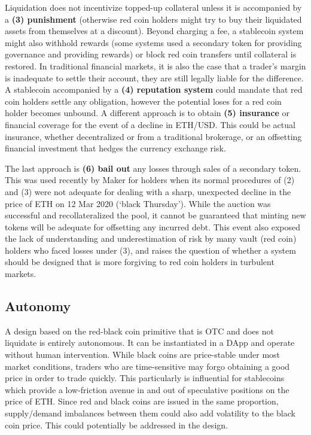 Liquidation does not incentivize topped-up collateral unless it is accompanied by a \textbf{(3) punishment} (otherwise red coin holders might try to buy their liquidated assets from themselves at a discount). Beyond charging a fee, a stablecoin system might also withhold rewards (some systems used a secondary token for providing governance and providing rewards) or block red coin transfers until collateral is restored. In traditional financial markets, it is also the case that a trader's margin is inadequate to settle their account, they are still legally liable for the difference. A stablecoin accompanied by a \textbf{(4) reputation system} could mandate that red coin holders settle any obligation, however the potential loses for a red coin holder becomes unbound. A different approach is to obtain \textbf{(5) insurance} or financial coverage for the event of a decline in ETH/USD. This could be actual insurance, whether decentralized or from a traditional brokerage, or an offsetting financial investment that hedges the currency exchange risk. %

The last approach is \textbf{(6) bail out} any losses through sales of a secondary token. This was used recently by Maker for \dai holders when its normal procedures of (2) and (3) were not adequate for dealing with a sharp, unexpected decline in the price of ETH on 12 Mar 2020 (`black Thursday'). While the auction was successful and recollateralized the pool, it cannot be guaranteed that minting new tokens will be adequate for offsetting any incurred debt. This event also exposed the lack of understanding and underestimation of risk by many vault (\ie red coin) holders who faced losses under (3), and raises the question of whether a system should be designed that is more forgiving to red coin holders in turbulent markets.%


\subsection{Autonomy} 

A design based on the red-black coin primitive that is OTC and does not liquidate is entirely autonomous. It can be instantiated in a DApp and operate without human intervention. While black coins are price-stable under most market conditions, traders who are time-sensitive may forgo obtaining a good price in order to trade quickly. This particularly is influential for stablecoins which provide a low-friction avenue in and out of speculative positions on the price of ETH. Since red and black coins are issued in the same proportion, supply/demand imbalances between them could also add volatility to the black coin price. This could potentially be addressed in the design. 

